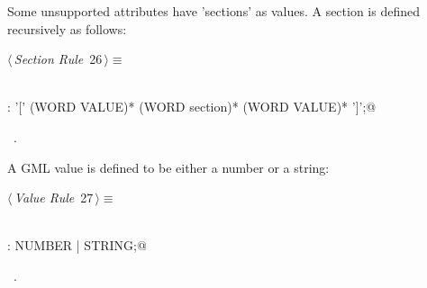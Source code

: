 \documentclass[a4paper]{report}
\begin{document}
Some unsupported attributes have 'sections' as values. A section is defined recursively as follows:
\begin{flushleft} \small
\begin{minipage}{\linewidth}\label{scrap26}\raggedright\small
{} $\langle\,${\itshape Section Rule}\nobreak\ {\footnotesize {26}}$\,\rangle\equiv$
\vspace{-1ex}
\begin{list}{}{} \item
\mbox{}\verb@@\\
\mbox{}\verb@section: '[' (WORD VALUE)*  (WORD section)* (WORD VALUE)* ']';@\\
\mbox{}\verb@@{\NWsep}
\end{list}
\vspace{-1.5ex}
\footnotesize
\begin{list}{}{\setlength{\itemsep}{-\parsep}\setlength{\itemindent}{-\leftmargin}}
\item \NWtxtMacroRefIn\ .

\item{}
\end{list}
\end{minipage}\vspace{4ex}
\end{flushleft}
A GML value is defined to be either a number or a string:
\begin{flushleft} \small
\begin{minipage}{\linewidth}\label{scrap27}\raggedright\small
{} $\langle\,${\itshape Value Rule}\nobreak\ {\footnotesize {27}}$\,\rangle\equiv$
\vspace{-1ex}
\begin{list}{}{} \item
\mbox{}\verb@@\\
\mbox{}\verb@VALUE: NUMBER | STRING;@\\
\mbox{}\verb@@{\NWsep}
\end{list}
\vspace{-1.5ex}
\footnotesize
\begin{list}{}{\setlength{\itemsep}{-\parsep}\setlength{\itemindent}{-\leftmargin}}
\item \NWtxtMacroRefIn\ .

\item{}
\end{list}
\end{minipage}\vspace{4ex}
\end{flushleft}
\end{document}
